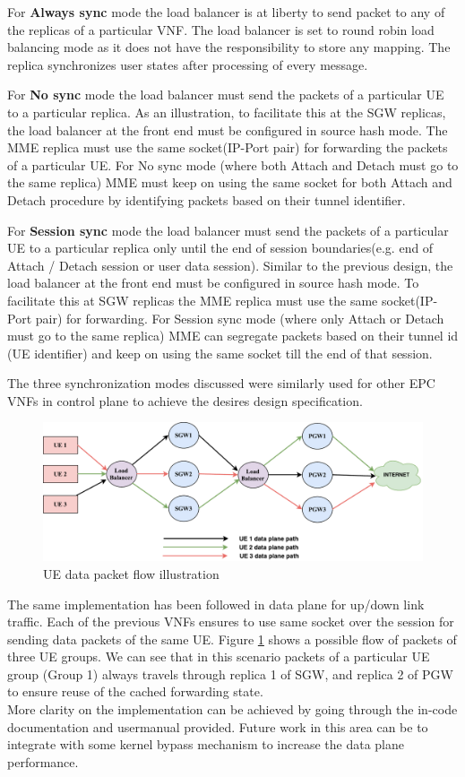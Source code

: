 \documentclass[hidelinks]{report}
\begin{document}
For \textbf{Always sync} mode the load balancer is at liberty to send packet to any of the replicas of a particular VNF. The load balancer is set to round robin load balancing mode as it does not have the responsibility to store any mapping. The replica synchronizes user states after processing of every message.

For \textbf{No sync} mode the load balancer must send the packets of a particular UE to a particular replica. As an illustration, to facilitate this at the SGW replicas, the load balancer at the front end must be configured in source hash mode. The MME replica must use the same socket(IP-Port pair) for forwarding the packets of a particular UE. For No sync mode (where both Attach and Detach must go to the same replica) MME must keep on using the same socket for both Attach and Detach procedure by identifying packets based on their tunnel identifier.

For \textbf{Session sync} mode the load balancer must send the packets of a particular UE to a particular replica only until the end of session boundaries(e.g. end of Attach / Detach session or user data session). Similar to the previous design, the load balancer at the front end must be configured in source hash mode. To facilitate this at SGW replicas  the MME replica must use the same socket(IP-Port pair) for forwarding. For Session sync mode (where only Attach or Detach must go to the same replica) MME can segregate packets based on their tunnel id (UE identifier) and keep on using the same socket till the end of that session.

The three synchronization modes discussed were similarly used for other EPC VNFs in control plane to achieve the desires design specification.

\begin{figure}[H]
\centering
\includegraphics[width = \linewidth]{images/datapath.pdf}
\caption{UE data packet flow illustration}
\label{fig:dpath}
\end{figure}
\par The same implementation has been followed  in data plane for up/down link traffic. Each of the previous VNFs ensures to use same socket over the session for sending data packets of the same UE. Figure \ref{fig:dpath} shows a possible flow of packets of three UE groups. We can see that in this scenario packets of a particular UE group (Group 1) always travels through replica 1 of SGW, and replica 2 of PGW to ensure reuse of the cached forwarding state.\\

More clarity on the implementation can be achieved by going through the in-code documentation and usermanual provided.
Future work in this area can be to integrate with some kernel bypass mechanism to increase the data plane performance.
\end{document}
